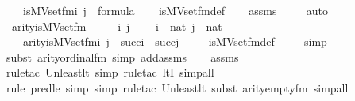 \begin{isabellebody}
\ \ \ {\isachardoublequoteopen}is{\isacharunderscore}{\kern0pt}MVset{\isacharunderscore}{\kern0pt}fm{\isacharparenleft}{\kern0pt}i{\isacharcomma}{\kern0pt}\ j{\isacharparenright}{\kern0pt}\ {\isasymin}\ formula{\isachardoublequoteclose}\isanewline
%
\isadelimproof
\ \ %
\endisadelimproof
%
\isatagproof
{}\isamarkupfalse%
\ is{\isacharunderscore}{\kern0pt}MVset{\isacharunderscore}{\kern0pt}fm{\isacharunderscore}{\kern0pt}def\isanewline
\ \ \isamarkupfalse%
\ assms\ \isanewline
\ \ \isamarkupfalse%
\ auto%
\endisatagproof
{\isafoldproof}%
%
\isadelimproof
\isanewline
%
\endisadelimproof
\isanewline
{}\isamarkupfalse%
\ arity{\isacharunderscore}{\kern0pt}is{\isacharunderscore}{\kern0pt}MVset{\isacharunderscore}{\kern0pt}fm\ {\isacharcolon}{\kern0pt}\ \isanewline
\ \ \ i\ j\ \isanewline
\ \ \ {\isachardoublequoteopen}i\ {\isasymin}\ nat{\isachardoublequoteclose}\ {\isachardoublequoteopen}j\ {\isasymin}\ nat{\isachardoublequoteclose}\ \isanewline
\ \ \ {\isachardoublequoteopen}arity{\isacharparenleft}{\kern0pt}is{\isacharunderscore}{\kern0pt}MVset{\isacharunderscore}{\kern0pt}fm{\isacharparenleft}{\kern0pt}i{\isacharcomma}{\kern0pt}\ j{\isacharparenright}{\kern0pt}{\isacharparenright}{\kern0pt}\ {\isasymle}\ succ{\isacharparenleft}{\kern0pt}i{\isacharparenright}{\kern0pt}\ {\isasymunion}\ succ{\isacharparenleft}{\kern0pt}j{\isacharparenright}{\kern0pt}{\isachardoublequoteclose}\ \isanewline
%
\isadelimproof
\ \ %
\endisadelimproof
%
\isatagproof
{}\isamarkupfalse%
\ is{\isacharunderscore}{\kern0pt}MVset{\isacharunderscore}{\kern0pt}fm{\isacharunderscore}{\kern0pt}def\ \isanewline
\ \ \isamarkupfalse%
\ simp\isanewline
\ \ \isamarkupfalse%
{\isacharparenleft}{\kern0pt}subst\ arity{\isacharunderscore}{\kern0pt}ordinal{\isacharunderscore}{\kern0pt}fm{\isacharcomma}{\kern0pt}\ simp\ add{\isacharcolon}{\kern0pt}assms{\isacharparenright}{\kern0pt}\isanewline
\ \ \isamarkupfalse%
\ assms\isanewline
\ \ \isamarkupfalse%
{\isacharparenleft}{\kern0pt}rule{\isacharunderscore}{\kern0pt}tac\ Un{\isacharunderscore}{\kern0pt}least{\isacharunderscore}{\kern0pt}lt{\isacharcomma}{\kern0pt}\ simp{\isacharcomma}{\kern0pt}\ rule{\isacharunderscore}{\kern0pt}tac\ ltI{\isacharcomma}{\kern0pt}\ simp{\isacharunderscore}{\kern0pt}all{\isacharparenright}{\kern0pt}\isanewline
\ \ \isamarkupfalse%
{\isacharparenleft}{\kern0pt}rule\ pred{\isacharunderscore}{\kern0pt}le{\isacharcomma}{\kern0pt}\ simp{\isacharcomma}{\kern0pt}\ simp{\isacharcomma}{\kern0pt}\ rule{\isacharunderscore}{\kern0pt}tac\ Un{\isacharunderscore}{\kern0pt}least{\isacharunderscore}{\kern0pt}lt{\isacharcomma}{\kern0pt}\ subst\ arity{\isacharunderscore}{\kern0pt}empty{\isacharunderscore}{\kern0pt}fm{\isacharcomma}{\kern0pt}\ simp{\isacharunderscore}{\kern0pt}all{\isacharparenright}{\kern0pt}\isanewline

\end{isabellebody}
